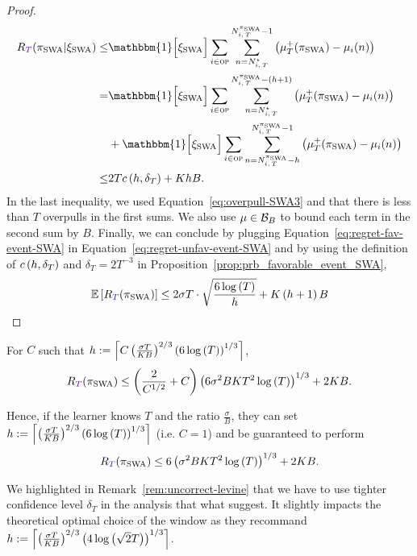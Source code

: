 \begin{proof}
\begin{align}
\regret(\piSWA| \HPSWA) \leq&  \mathbbm{1} \Big[\HPSWA\Big] \sum_{i\in \overpullSet}    \sum_{n=\NiT^\star}^{\NiT^{\piSWA}-1} \pa{\mu^+_T(\piSWA) - \mu_i(n)}\nonumber\\
=&  \mathbbm{1} \Big[\HPSWA\Big] \sum_{i\in \overpullSet}    \sum_{n=\NiT^\star}^{\NiT^{\piSWA}-\pa{h+1}} \pa{\mu^+_T(\piSWA) - \mu_i(n)} \nonumber\\ 
&+ \mathbbm{1} \Big[\HPSWA\Big] \sum_{i\in \overpullSet} \sum_{n=\NiT^{\piSWA} - h }^{\NiT^{\piSWA}-1} \pa{\mu^+_T(\piSWA) - \mu_i(n)}\nonumber\\
\leq& 2Tc\pa{h,\delta_T} + KhB.
\label{eq:regret-fav-event-SWA}
\end{align}
In the last inequality, we used Equation~\ref{eq:overpull-SWA3} and that there is less than $T$ overpulls in the first sums. We also use $\mu \in \mathcal{B}_{B}$ to bound each term in the second sum by $B$. Finally,  we can conclude by plugging Equation~\ref{eq:regret-fav-event-SWA} in Equation~\ref{eq:regret-unfav-event-SWA} and by using the definition of $c\left(h,\delta_T\right)$ and $\delta_T= 2T^{-3}$ in Proposition~\ref{prop:prb_favorable_event_SWA},
\[
\EE{\regret(\piSWA)} \leq 2\sigma T\cdot\sqrt{\frac{6\log\pa{T}}{h}} + K\pa{h+1}B
\]
\end{proof}
\begin{corollary}
\label{cor:SWA}
For $C$ such that $h:= \left\lceil C \left(\frac{\sigma T}{KB}\right)^{2/3}\left(6\log\left(T\right)\right)^{1/3}\right\rceil$, 
\[
\regret(\piSWA) \leq \pa{\frac{2}{C^{1/2}} + C} \pa{6 \sigma^2 B K T^2 \log\pa{T}}^{1/3} + 2KB. 
\]

Hence, if the learner knows $T$ and the ratio $\frac{\sigma}{B}$, they can set $h:= \left\lceil\left(\frac{\sigma T}{KB}\right)^{2/3}\left(6\log\left(T\right)\right)^{1/3}\right\rceil$ (i.e. $C=1$) and be guaranteed to perform 
\[
\regret(\piSWA) \leq 6 \pa{\sigma^2 B K T^2 \log\pa{T}}^{1/3} + 2KB. 
\]

\end{corollary}

\begin{remark}
\label{rem:comparaison-levine}
We highlighted in Remark~\ref{rem:uncorrect-levine} that we have to use tighter confidence level $\delta_T$  in the analysis that what \citet{levine2017rotting} suggest. It slightly impacts the theoretical optimal choice of the window as they recommand  $h:= \left\lceil\left(\frac{\sigma T}{KB}\right)^{2/3}\left(4\log\left(\sqrt{2}T\right)\right)^{1/3}\right\rceil$.
\end{remark}

